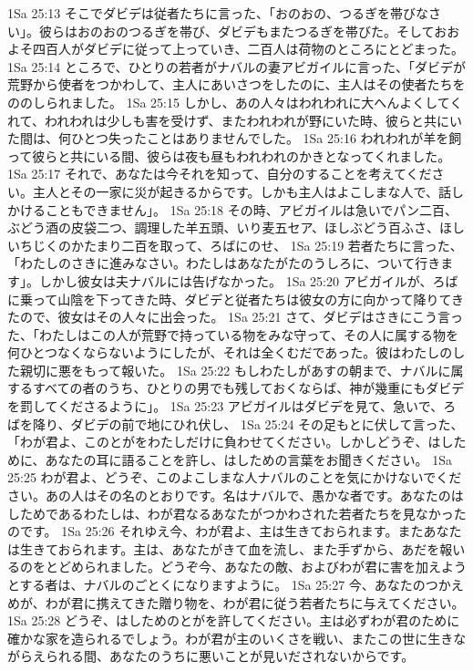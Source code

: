 1Sa 25:13  そこでダビデは従者たちに言った、「おのおの、つるぎを帯びなさい」。彼らはおのおのつるぎを帯び、ダビデもまたつるぎを帯びた。そしておおよそ四百人がダビデに従って上っていき、二百人は荷物のところにとどまった。
1Sa 25:14  ところで、ひとりの若者がナバルの妻アビガイルに言った、「ダビデが荒野から使者をつかわして、主人にあいさつをしたのに、主人はその使者たちをののしられました。
1Sa 25:15  しかし、あの人々はわれわれに大へんよくしてくれて、われわれは少しも害を受けず、またわれわれが野にいた時、彼らと共にいた間は、何ひとつ失ったことはありませんでした。
1Sa 25:16  われわれが羊を飼って彼らと共にいる間、彼らは夜も昼もわれわれのかきとなってくれました。
1Sa 25:17  それで、あなたは今それを知って、自分のすることを考えてください。主人とその一家に災が起きるからです。しかも主人はよこしまな人で、話しかけることもできません」。
1Sa 25:18  その時、アビガイルは急いでパン二百、ぶどう酒の皮袋二つ、調理した羊五頭、いり麦五セア、ほしぶどう百ふさ、ほしいちじくのかたまり二百を取って、ろばにのせ、
1Sa 25:19  若者たちに言った、「わたしのさきに進みなさい。わたしはあなたがたのうしろに、ついて行きます」。しかし彼女は夫ナバルには告げなかった。
1Sa 25:20  アビガイルが、ろばに乗って山陰を下ってきた時、ダビデと従者たちは彼女の方に向かって降りてきたので、彼女はその人々に出会った。
1Sa 25:21  さて、ダビデはさきにこう言った、「わたしはこの人が荒野で持っている物をみな守って、その人に属する物を何ひとつなくならないようにしたが、それは全くむだであった。彼はわたしのした親切に悪をもって報いた。
1Sa 25:22  もしわたしがあすの朝まで、ナバルに属するすべての者のうち、ひとりの男でも残しておくならば、神が幾重にもダビデを罰してくださるように」。
1Sa 25:23  アビガイルはダビデを見て、急いで、ろばを降り、ダビデの前で地にひれ伏し、
1Sa 25:24  その足もとに伏して言った、「わが君よ、このとがをわたしだけに負わせてください。しかしどうぞ、はしために、あなたの耳に語ることを許し、はしための言葉をお聞きください。
1Sa 25:25  わが君よ、どうぞ、このよこしまな人ナバルのことを気にかけないでください。あの人はその名のとおりです。名はナバルで、愚かな者です。あなたのはしためであるわたしは、わが君なるあなたがつかわされた若者たちを見なかったのです。
1Sa 25:26  それゆえ今、わが君よ、主は生きておられます。またあなたは生きておられます。主は、あなたがきて血を流し、また手ずから、あだを報いるのをとどめられました。どうぞ今、あなたの敵、およびわが君に害を加えようとする者は、ナバルのごとくになりますように。
1Sa 25:27  今、あなたのつかえめが、わが君に携えてきた贈り物を、わが君に従う若者たちに与えてください。
1Sa 25:28  どうぞ、はしためのとがを許してください。主は必ずわが君のために確かな家を造られるでしょう。わが君が主のいくさを戦い、またこの世に生きながらえられる間、あなたのうちに悪いことが見いだされないからです。
